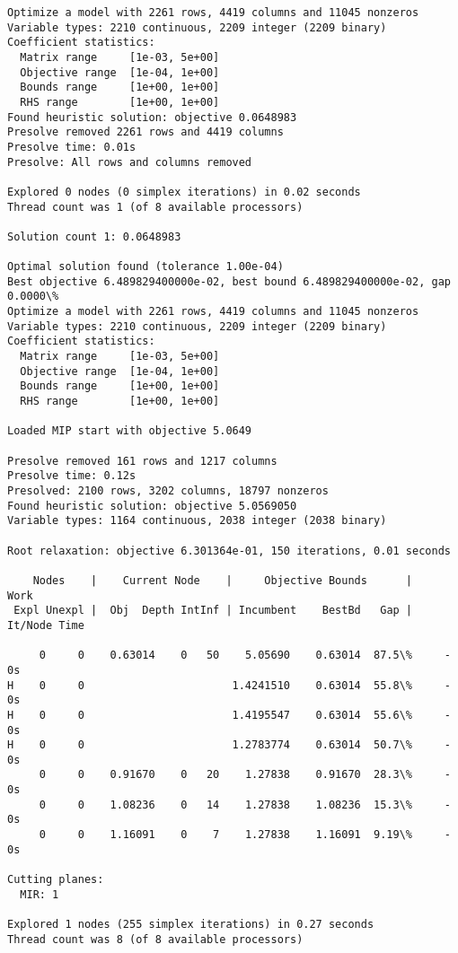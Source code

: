 \documentclass[11pt]{article}
\begin{document}
    \begin{Verbatim}[commandchars=\\\{\}]
Optimize a model with 2261 rows, 4419 columns and 11045 nonzeros
Variable types: 2210 continuous, 2209 integer (2209 binary)
Coefficient statistics:
  Matrix range     [1e-03, 5e+00]
  Objective range  [1e-04, 1e+00]
  Bounds range     [1e+00, 1e+00]
  RHS range        [1e+00, 1e+00]
Found heuristic solution: objective 0.0648983
Presolve removed 2261 rows and 4419 columns
Presolve time: 0.01s
Presolve: All rows and columns removed

Explored 0 nodes (0 simplex iterations) in 0.02 seconds
Thread count was 1 (of 8 available processors)

Solution count 1: 0.0648983 

Optimal solution found (tolerance 1.00e-04)
Best objective 6.489829400000e-02, best bound 6.489829400000e-02, gap 0.0000\%
Optimize a model with 2261 rows, 4419 columns and 11045 nonzeros
Variable types: 2210 continuous, 2209 integer (2209 binary)
Coefficient statistics:
  Matrix range     [1e-03, 5e+00]
  Objective range  [1e-04, 1e+00]
  Bounds range     [1e+00, 1e+00]
  RHS range        [1e+00, 1e+00]

Loaded MIP start with objective 5.0649

Presolve removed 161 rows and 1217 columns
Presolve time: 0.12s
Presolved: 2100 rows, 3202 columns, 18797 nonzeros
Found heuristic solution: objective 5.0569050
Variable types: 1164 continuous, 2038 integer (2038 binary)

Root relaxation: objective 6.301364e-01, 150 iterations, 0.01 seconds

    Nodes    |    Current Node    |     Objective Bounds      |     Work
 Expl Unexpl |  Obj  Depth IntInf | Incumbent    BestBd   Gap | It/Node Time

     0     0    0.63014    0   50    5.05690    0.63014  87.5\%     -    0s
H    0     0                       1.4241510    0.63014  55.8\%     -    0s
H    0     0                       1.4195547    0.63014  55.6\%     -    0s
H    0     0                       1.2783774    0.63014  50.7\%     -    0s
     0     0    0.91670    0   20    1.27838    0.91670  28.3\%     -    0s
     0     0    1.08236    0   14    1.27838    1.08236  15.3\%     -    0s
     0     0    1.16091    0    7    1.27838    1.16091  9.19\%     -    0s

Cutting planes:
  MIR: 1

Explored 1 nodes (255 simplex iterations) in 0.27 seconds
Thread count was 8 (of 8 available processors)


\end{Verbatim}
\end{document}
